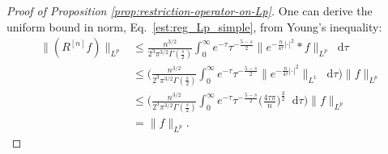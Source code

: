 \documentclass[12pt,a4paper]{amsart}
\numberwithin{equation}{section}
\newcommand*\diff{\mathop{}\!\mathrm{d}}
\begin{document}
	\begin{proof}[Proof of Proposition \ref{prop:restriction-operator-on-Lp}]
		One can derive the uniform bound in norm, Eq.~\eqref{est:reg_Lp_simple}, from Young's inequality: %
		\begin{align*}
			\| (R^{[n]}f) \|_{L^p} &\leq  \frac{n^{3/2}}{2^{3} \pi^{3/2} \Gamma(\frac{s}{2})} \int_{0}^{\infty}  e^{-\tau} \tau^{-\frac{5-s}{2}} \| e^{-\frac{n}{4 \tau} |\cdot|^2} \ast f \|_{L^p} \diff \tau \\
			&\leq  \Bigg( \frac{n^{3/2}}{2^{3} \pi^{3/2} \Gamma(\frac{s}{2})} \int_{0}^{\infty}  e^{-\tau} \tau^{-\frac{5-s}{2}} \| e^{-\frac{n}{4 \tau} |\cdot|^2}  \|_{L^1} \diff \tau \Bigg) \| f \|_{L^p}  \\
			&\leq  \Bigg( \frac{n^{3/2}}{2^{3} \pi^{3/2} \Gamma(\frac{s}{2})} \int_{0}^{\infty}  e^{-\tau} \tau^{-\frac{5-s}{2}} \big( \frac{4 \tau \pi}{n}\big)^{\frac{3}{2}} \diff \tau \Bigg) \| f \|_{L^p}  \\
			&=  \| f \|_{L^p} .
		\end{align*}
		

\end{proof}
\end{document}
